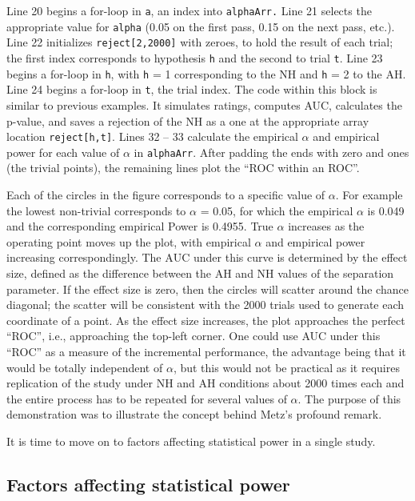 \documentclass[
]{book}
\begin{document}
Line 20 begins a for-loop in \texttt{a}, an index into \texttt{alphaArr.} Line 21 selects the appropriate value for \texttt{alpha} (0.05 on the first pass, 0.15 on the next pass, etc.). Line 22 initializes \texttt{reject{[}2,2000{]}} with zeroes, to hold the result of each trial; the first index corresponds to hypothesis \texttt{h} and the second to trial \texttt{t}. Line 23 begins a for-loop in \texttt{h}, with \texttt{h} = 1 corresponding to the NH and \texttt{h} = 2 to the AH. Line 24 begins a for-loop in \texttt{t}, the trial index. The code within this block is similar to previous examples. It simulates ratings, computes AUC, calculates the p-value, and saves a rejection of the NH as a one at the appropriate array location \texttt{reject{[}h,t{]}}. Lines 32 -- 33 calculate the empirical \(\alpha\) and empirical power for each value of \(\alpha\) in \texttt{alphaArr}. After padding the ends with zero and ones (the trivial points), the remaining lines plot the ``ROC within an ROC''.

Each of the circles in the figure corresponds to a specific value of \(\alpha\). For example the lowest non-trivial corresponds to \(\alpha\) = 0.05, for which the empirical \(\alpha\) is 0.049 and the corresponding empirical Power is 0.4955. True \(\alpha\) increases as the operating point moves up the plot, with empirical \(\alpha\) and empirical power increasing correspondingly. The \(\text{AUC}\) under this curve is determined by the effect size, defined as the difference between the AH and NH values of the separation parameter. If the effect size is zero, then the circles will scatter around the chance diagonal; the scatter will be consistent with the 2000 trials used to generate each coordinate of a point. As the effect size increases, the plot approaches the perfect ``ROC'', i.e., approaching the top-left corner. One could use AUC under this ``ROC'' as a measure of the incremental performance, the advantage being that it would be totally independent of \(\alpha\), but this would not be practical as it requires replication of the study under NH and AH conditions about 2000 times each and the entire process has to be repeated for several values of \(\alpha\). The purpose of this demonstration was to illustrate the concept behind Metz's profound remark.

It is time to move on to factors affecting statistical power in a single study.

\hypertarget{factors-affecting-statistical-power}{%
\subsection{Factors affecting statistical power}\label{factors-affecting-statistical-power}}
\end{document}
